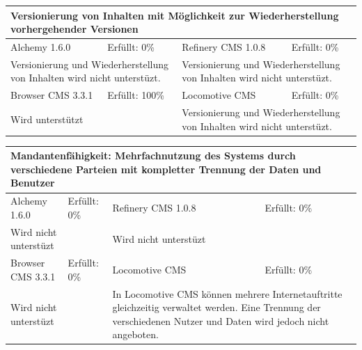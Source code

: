 \newline
\newline
\newline
\begin{tabular}[!ht]{|l|l|l|l|}
\hline
\multicolumn{4}{|p{15cm}|}{\textbf{Versionierung von Inhalten mit Möglichkeit zur Wiederherstellung vorhergehender Versionen}} \\
\hline
  Alchemy 1.6.0 & \cellcolor{red}Erfüllt: 0\% & Refinery CMS 1.0.8 & \cellcolor{red}Erfüllt: 0\% \\
  \hline
  \multicolumn{2}{|p{7.5cm}|}{Versionierung und Wiederherstellung von Inhalten wird nicht unterstüzt.} & \multicolumn{2}{p{7.5cm}|}{Versionierung und Wiederherstellung von Inhalten wird nicht unterstüzt.} \\
  \hline
  Browser CMS 3.3.1 & \cellcolor{green}Erfüllt: 100\% & Locomotive CMS & \cellcolor{red}Erfüllt: 0\% \\
  \hline
  \multicolumn{2}{|p{7.5cm}|}{Wird unterstützt} & \multicolumn{2}{p{7.5cm}|}{Versionierung und Wiederherstellung von Inhalten wird nicht unterstüzt.} \\
\hline
\end{tabular}
\newline
\newline
\newline
\begin{tabular}[!ht]{|l|l|l|l|}
\hline
\multicolumn{4}{|p{15cm}|}{\textbf{Mandantenfähigkeit: Mehrfachnutzung des Systems durch verschiedene Parteien mit kompletter Trennung der Daten und Benutzer}} \\
\hline
  Alchemy 1.6.0 & \cellcolor{red}Erfüllt: 0\% & Refinery CMS 1.0.8 & \cellcolor{red}Erfüllt: 0\% \\
  \hline
  \multicolumn{2}{|p{7.5cm}|}{Wird nicht unterstüzt} & \multicolumn{2}{p{7.5cm}|}{Wird nicht unterstüzt} \\
  \hline
  Browser CMS 3.3.1 & \cellcolor{red}Erfüllt: 0\% & Locomotive CMS & \cellcolor{red}Erfüllt: 0\% \\
  \hline
  \multicolumn{2}{|p{7.5cm}|}{Wird nicht unterstüzt} & \multicolumn{2}{p{7.5cm}|}{In Locomotive CMS können mehrere Internetauftritte gleichzeitig verwaltet werden. Eine Trennung der verschiedenen Nutzer und Daten wird jedoch nicht angeboten.} \\
\hline
\end{tabular}
\newline
\newline
\newline
